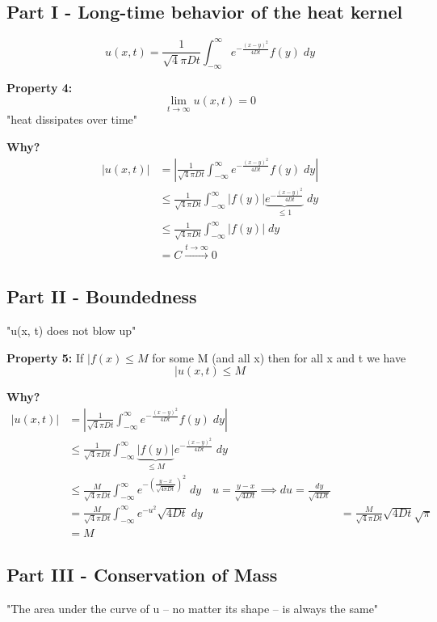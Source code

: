 \documentclass[12pt]{article}
\begin{document}
\subsection*{Part I - Long-time behavior of the heat kernel}
\[u(x, t) = \frac{1}{\sqrt4\pi D t} \int_{-\infty}^\infty e^{-\frac{(x - y)^2}{4Dt}} f(y) \; dy\]

\textbf{Property 4:} 
\[\lim_{t \to \infty} u(x, t) = 0\]
"heat dissipates over time"

\textbf{Why?}
\begin{align*}
    |u(x, t)| &= \left|\frac{1}{\sqrt4\pi D t} \int_{-\infty}^\infty e^{-\frac{(x - y)^2}{4Dt}} f(y) \; dy\right|\\
    &\leq \frac{1}{\sqrt4\pi D t} \int_{-\infty}^\infty |f(y)| \underbrace{e^{-\frac{(x - y)^2}{4Dt}}}_{\leq 1} \; dy\\
    &\leq \frac{1}{\sqrt4\pi D t} \int_{-\infty}^\infty |f(y)| \; dy\\
    &= C \overset{t \to \infty}{\longrightarrow} 0
\end{align*}

\subsection*{Part II - Boundedness}
"u(x, t) does not blow up"

\textbf{Property 5: } If $|f(x) \leq M$ for some M (and all x) then for all x and t we have 
\[|u(x, t) \leq M\]

\textbf{Why?}
\begin{align*}
    |u(x, t)| &= \left|\frac{1}{\sqrt4\pi D t} \int_{-\infty}^\infty e^{-\frac{(x - y)^2}{4Dt}} f(y) \; dy\right|\\
    &\leq \frac{1}{\sqrt4\pi D t} \int_{-\infty}^\infty \underbrace{|f(y)|}_{\leq M} e^{-\frac{(x - y)^2}{4Dt}}\; dy\\
    &\leq \frac{M}{\sqrt4\pi Dt} \int_{-\infty}^\infty e^{-\left(\frac{y - x}{\sqrt{4\pi Dt}}\right)^2}\; dy \quad u = \frac{y - x}{\sqrt{4Dt}} \implies du = \frac{dy}{\sqrt{4Dt}}\\
    &= \frac{M}{\sqrt4\pi Dt} \int_{-\infty}^\infty e^{-u^2}\sqrt{4Dt}\; dy 
    &= \frac{M}{\sqrt4\pi Dt} \sqrt{4Dt} \sqrt{\pi}\\
    &= M
\end{align*}

\subsection*{Part III - Conservation of Mass}
"The area under the curve of u -- no matter its shape -- is always the same"
\end{document}
